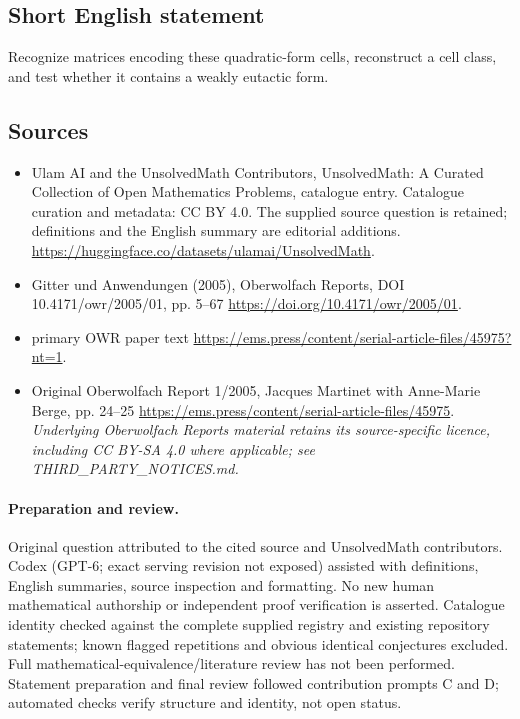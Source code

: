 \documentclass[11pt]{article}
\begin{document}
\subsection{Short English statement}
Recognize matrices encoding these quadratic-form cells, reconstruct a cell class, and test whether it contains a weakly eutactic form.
\subsection{Sources}
\begin{itemize}
\item[\hypertarget{source:statement:1}{S1}] Ulam AI and the UnsolvedMath Contributors, UnsolvedMath: A Curated Collection of Open Mathematics Problems, catalogue entry. Catalogue curation and metadata: CC BY 4.0. The supplied source question is retained; definitions and the English summary are editorial additions.
\url{https://huggingface.co/datasets/ulamai/UnsolvedMath}.
\item[\hypertarget{source:statement:2}{S2}] Gitter und Anwendungen (2005), Oberwolfach Reports, DOI 10.4171/owr/2005/01, pp. 5--67
\url{https://doi.org/10.4171/owr/2005/01}.
\item[\hypertarget{source:statement:3}{S3}] primary OWR paper text
\url{https://ems.press/content/serial-article-files/45975?nt=1}.
\item[\hypertarget{source:statement:4}{S4}] Original Oberwolfach Report 1/2005, Jacques Martinet with Anne-Marie Berge, pp. 24--25
\url{https://ems.press/content/serial-article-files/45975}.
\textit{Underlying Oberwolfach Reports material retains its source-specific licence, including CC BY-SA 4.0 where applicable; see THIRD\_PARTY\_NOTICES.md.}
\end{itemize}
\paragraph{Preparation and review.}
Original question attributed to the cited source and UnsolvedMath contributors. Codex (GPT-6; exact serving revision not exposed) assisted with definitions, English summaries, source inspection and formatting. No new human mathematical authorship or independent proof verification is asserted. Catalogue identity checked against the complete supplied registry and existing repository statements; known flagged repetitions and obvious identical conjectures excluded. Full mathematical-equivalence/literature review has not been performed. Statement preparation and final review followed contribution prompts C and D; automated checks verify structure and identity, not open status.
\label{end:statement}
\end{document}
